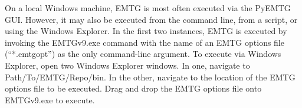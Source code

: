 
On a local Windows machine, \ac{EMTG} is most often executed via the PyEMTG \ac{GUI}. However, it may also be executed from the command line, from a script, or using the Windows Explorer. In the first two instances, \ac{EMTG} is executed by invoking the EMTGv9.exe command with the name of an \ac{EMTG} options file (``*.emtgopt'') as the only command-line argument. To execute via Windows Explorer, open two Windows Explorer windows. In one, navigate to Path/To/EMTG/Repo/bin. In the other, navigate to the location of the \ac{EMTG} options file to be executed. Drag and drop the \ac{EMTG} options file onto EMTGv9.exe to execute.